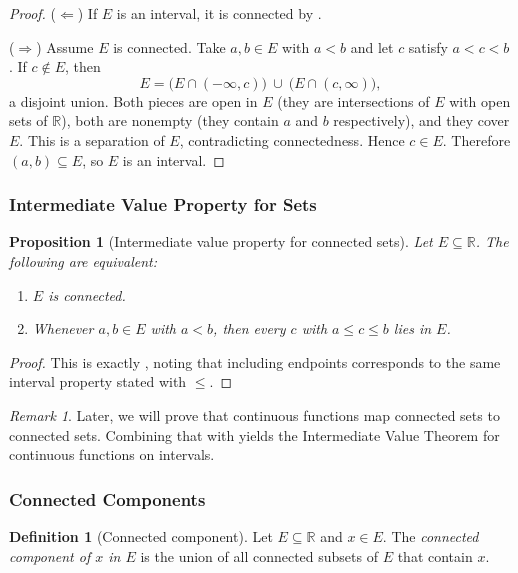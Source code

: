 \documentclass[12pt]{article}
\numberwithin{equation}{section}
\newcommand{\RR}{\mathbb{R}}
\theoremstyle{plain}
\newtheorem{proposition}[theorem]{Proposition}
\theoremstyle{definition}
\newtheorem{definition}[theorem]{Definition}
\theoremstyle{remark}
\newtheorem{remark}[theorem]{Remark}
\begin{document}
\begin{proof}
($\Leftarrow$) If $E$ is an interval, it is connected by .

($\Rightarrow$) Assume $E$ is connected.
Take $a,b\in E$ with $a<b$ and let $c$ satisfy $a<c<b$.
If $c\notin E$, then
\[
E = \bigl(E\cap(-\infty,c)\bigr)\ \cup\ \bigl(E\cap(c,\infty)\bigr),
\]
a disjoint union. Both pieces are open in $E$ (they are intersections of $E$ with open sets of $\RR$),
both are nonempty (they contain $a$ and $b$ respectively), and they cover $E$.
This is a separation of $E$, contradicting connectedness. Hence $c\in E$.
Therefore $(a,b)\subseteq E$, so $E$ is an interval.
\end{proof}

\subsubsection{Intermediate Value Property for Sets}

\begin{proposition}[Intermediate value property for connected sets]\label{prop:ivp-sets}
Let $E\subseteq\RR$. The following are equivalent:
\begin{enumerate}[label=(\alph*)]
\item $E$ is connected.
\item Whenever $a,b\in E$ with $a<b$, then every $c$ with $a\le c\le b$ lies in $E$.
\end{enumerate}
\end{proposition}

\begin{proof}
This is exactly , noting that including endpoints corresponds to the same interval property stated with $\le$.
\end{proof}

\begin{remark}
Later, we will prove that continuous functions map connected sets to connected sets.
Combining that with  yields the Intermediate Value Theorem for continuous functions on intervals.
\end{remark}

\subsubsection{Connected Components}

\begin{definition}[Connected component]\label{def:component}
Let $E\subseteq\RR$ and $x\in E$.
The \emph{connected component of $x$ in $E$} is the union of all connected subsets of $E$ that contain $x$.
\end{definition}
\end{document}
